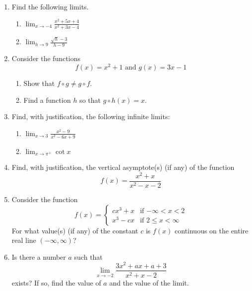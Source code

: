 \documentclass[12pt]{article}
\newcommand{\ds}{\displaystyle}
\begin{document}
\begin{enumerate}
\item Find the following limits.
  \begin{enumerate}
  \item $\ds \lim_{x\to -4} \frac{x^2+5x+4}{x^2+3x-4}$
\vfill
  \item $\ds \lim_{h\to 9} \frac{\sqrt{h}-3}{h-9}$
\vfill
  \end{enumerate}
\newpage
\item Consider the functions
  \begin{equation*}
    \mbox{$\ds f(x)= x^2+1$ and $\ds g(x)=3x-1$}
  \end{equation*}
  \begin{enumerate}
  \item Show that $f\circ g\ne g\circ f$.
\vfill
  \item Find a function $h$ so that $g\circ h(x)=x$.
\vfill
  \end{enumerate}
\newpage
\item Find, with justification, the following infinite limits:
  \begin{enumerate}
  \item $\ds \lim_{x\to 3} \frac{x^2-9}{x^2-6x+9}$
  \vfill
  \item $\ds \lim_{x\to \pi^+} \cot x$
  \vfill
  \end{enumerate}
\newpage
\item Find, with justification,
  the vertical asymptote(s) (if any) of the function
  \begin{displaymath}
    f(x) = \frac{x^2+x}{x^2-x-2}
  \end{displaymath}
\vfill
\newpage
\item Consider the function
  \begin{displaymath}
    f(x) = \begin{cases}
      cx^3 + x  & \mbox{if $-\infty<x<2$} \\
      x^3 - cx  & \mbox{if $2\le x < \infty$}
    \end{cases}
  \end{displaymath}
  For
  what value(s) (if any) of the constant $c$ is 
  $f(x)$ continuous on the entire
  real line $(-\infty,\infty)$?
\newpage
\item Is there a number $a$ such that
  \begin{displaymath}
    \lim_{x\to -2} \frac{3x^2+ax+a+3}{x^2+x-2}
  \end{displaymath}
  exists?  If so, find the value of $a$ and the value of the limit.
\end{enumerate}
\end{document}
